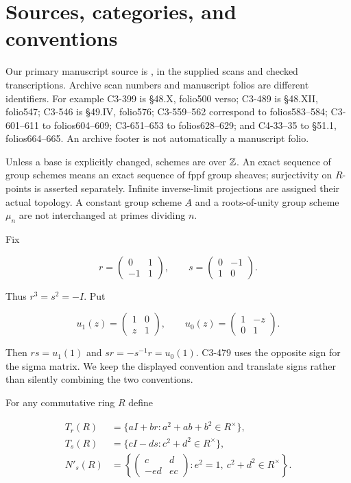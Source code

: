 \section{Sources, categories, and conventions}

Our primary manuscript source is \citet{AB_Grothendieck1981},
in the supplied scans and checked transcriptions. Archive scan
numbers and manuscript folios are different identifiers.
For example C3-399 is §48.X, folio500 verso; C3-489 is §48.XII,
folio547; C3-546 is §49.IV, folio576; C3-559--562 correspond to
folios583--584; C3-601--611 to folios604--609; C3-651--653 to
folios628--629; and C4-33--35 to §51.1, folios664--665.
An archive footer is not automatically a manuscript folio.

Unless a base is explicitly changed, schemes are over $\mathbb Z$.
An exact sequence of group schemes means an exact sequence of
fppf group sheaves; surjectivity on $R$-points is asserted
separately. Infinite inverse-limit projections are assigned their
actual topology. A constant group scheme $\underline A$ and a
roots-of-unity group scheme $\mu_n$ are not interchanged at
primes dividing $n$.

Fix

$$
r=\begin{pmatrix}0&1\\-1&1\end{pmatrix},\qquad
 s=\begin{pmatrix}0&-1\\1&0\end{pmatrix}.
$$

Thus $r^3=s^2=-I$. Put

$$
u_1(z)=\begin{pmatrix}1&0\\z&1\end{pmatrix},
 \qquad
 u_0(z)=\begin{pmatrix}1&-z\\0&1\end{pmatrix}.
$$

Then $rs=u_1(1)$ and $sr=-s^{-1}r=u_0(1)$.
C3-479 uses the opposite sign for the sigma matrix.
We keep the displayed convention and translate signs rather
than silently combining the two conventions.

For any commutative ring $R$ define

$$
\begin{split}
 T_r(R)&=\{aI+br:a^2+ab+b^2\in R^\times\},\\
 T_s(R)&=\{cI-ds:c^2+d^2\in R^\times\},\\
 N'_s(R)&=\left\{
 \begin{pmatrix}c&d\\-ed&ec\end{pmatrix}:
 e^2=1,\ c^2+d^2\in R^\times\right\}.
 \end{split}
$$

